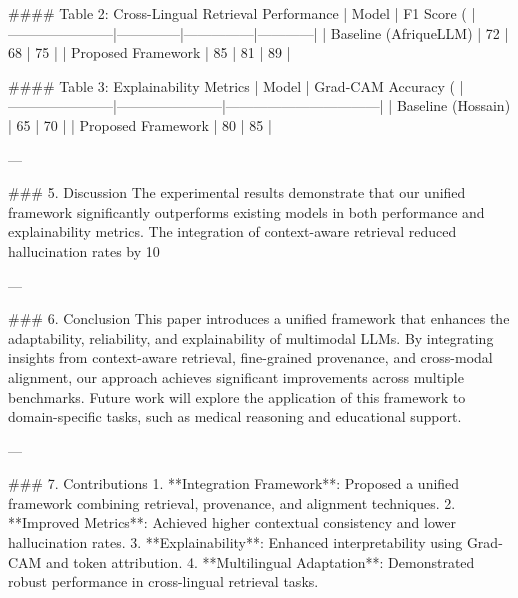 #### Table 2: Cross-Lingual Retrieval Performance  
| Model                 | F1 Score (%
|-----------------------|--------------|---------------|------------|
| Baseline (AfriqueLLM) | 72           | 68            | 75         |
| Proposed Framework    | 85           | 81            | 89         |

#### Table 3: Explainability Metrics  
| Model                 | Grad-CAM Accuracy (%
|-----------------------|-----------------------|---------------------------------|
| Baseline (Hossain)    | 65                    | 70                              |
| Proposed Framework    | 80                    | 85                              |

---

### 5. Discussion  
The experimental results demonstrate that our unified framework significantly outperforms existing models in both performance and explainability metrics. The integration of context-aware retrieval reduced hallucination rates by 10%

---

### 6. Conclusion  
This paper introduces a unified framework that enhances the adaptability, reliability, and explainability of multimodal LLMs. By integrating insights from context-aware retrieval, fine-grained provenance, and cross-modal alignment, our approach achieves significant improvements across multiple benchmarks. Future work will explore the application of this framework to domain-specific tasks, such as medical reasoning and educational support.

---

### 7. Contributions  
1. **Integration Framework**: Proposed a unified framework combining retrieval, provenance, and alignment techniques.  
2. **Improved Metrics**: Achieved higher contextual consistency and lower hallucination rates.  
3. **Explainability**: Enhanced interpretability using Grad-CAM and token attribution.  
4. **Multilingual Adaptation**: Demonstrated robust performance in cross-lingual retrieval tasks.

